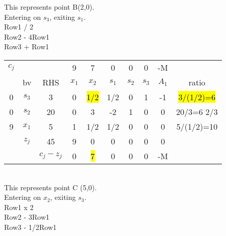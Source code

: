\documentclass[answers]{exam}
\begin{document}
\noindent
This represents point B(2,0). \\
Entering on $s_3$, exiting $s_1$. \\
Row1 / 2 \\
Row2 - 4Row1 \\
Row3 + Row1 \\

\begin{tabular}{cccccccccc}
	$c_j$                  &                            &                                & 9     & 7         & 0     & 0     & 0     & -M    &                 \\
	\multicolumn{1}{c|}{}  & \multicolumn{1}{c|}{bv}    & \multicolumn{1}{c|}{RHS}       & $x_1$ & $x_2$     & $s_1$ & $s_2$ & $s_3$ & $A_1$ & ratio           \\ \cline{1-9}
	\multicolumn{1}{c|}{0} & \multicolumn{1}{c|}{$s_3$} & \multicolumn{1}{c|}{3}         & 0     & \hl{1/2} & 1/2   & 0     & 1     & -1    & \hl{3/(1/2)=6} \\
	\multicolumn{1}{c|}{0} & \multicolumn{1}{c|}{$s_2$} & \multicolumn{1}{c|}{20}        & 0     & 3         & -2    & 1     & 0     & 0     & 20/3=6 2/3      \\
	\multicolumn{1}{c|}{9} & \multicolumn{1}{c|}{$x_1$} & \multicolumn{1}{c|}{5}         & 1     & 1/2       & 1/2   & 0     & 0     & 0     & 5/(1/2)=10      \\ \cline{1-9}
	& \multicolumn{1}{c|}{$z_j$} & \multicolumn{1}{c|}{45}        & 9     & 0         & 0     & 0     & 0     & 0     &                 \\ \cline{3-9}
	&                            & \multicolumn{1}{c|}{$c_j-z_j$} & 0     & \hl{7}   & 0     & 0     & 0     & -M    &                
\end{tabular} \\

\noindent
This represents point C (5,0). \\
Entering on $x_2$, exiting $s_3$. \\
Row1 x 2 \\
Row2 - 3Row1 \\
Row3 - 1/2Row1 \\
\end{document}
